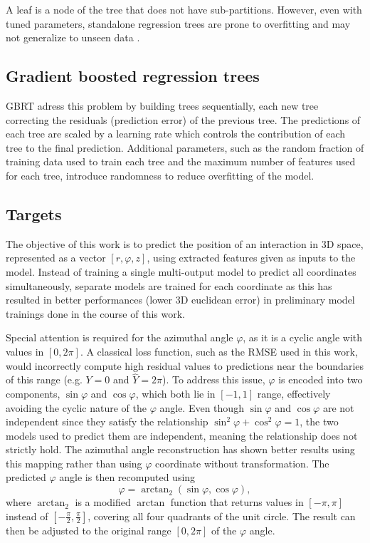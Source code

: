 A leaf is a node of the tree that does not have sub-partitions. However, even with tuned parameters, standalone regression trees are prone to overfitting and may not generalize to unseen data \cite{hastie01statisticallearning}.

\subsection{Gradient boosted regression trees}

GBRT adress this problem by building trees sequentially, each new tree correcting the residuals (prediction error) of the previous tree. The predictions of each tree are scaled by a learning rate which controls the contribution of each tree to the final prediction. Additional parameters, such as the random fraction of training data used to train each tree and the maximum number of features used for each tree, introduce randomness to reduce overfitting of the model.

\subsection{Targets}

The objective of this work is to predict the position of an interaction in 3D space, represented as a vector $[r, \varphi, z]$, using extracted features given as inputs to the model. Instead of training a single multi-output model to predict all coordinates simultaneously, separate models are trained for each coordinate as this has resulted in better performances (lower 3D euclidean error) in preliminary model trainings done in the course of this work.

Special attention is required for the azimuthal angle $\varphi$, as it is a cyclic angle with values in $[0, 2\pi]$. A classical loss function, such as the RMSE used in this work, would incorrectly compute high residual values to predictions near the boundaries of this range (e.g. $Y = 0$ and $\hat Y = 2\pi$).
To address this issue, $\varphi$ is encoded into two components, $\sin \varphi$ and $\cos \varphi$, which both lie in $[-1, 1]$ range, effectively avoiding the cyclic nature of the $\varphi$ angle. Even though $\sin \varphi$ and $\cos \varphi$ are not independent since they satisfy the relationship $\sin^2 \varphi + \cos^2 \varphi = 1$, the two models used to predict them are independent, meaning the relationship does not strictly hold. The azimuthal angle reconstruction has shown better results using this mapping rather than using $\varphi$ coordinate without transformation. The predicted $\varphi$ angle is then recomputed using 
\begin{equation}
\label{eq:atan2}
    \varphi = \operatorname{arctan}_2(\sin \varphi, \cos \varphi),
\end{equation}
where $\operatorname{arctan}_2$ is a modified $\arctan$ function that returns values in $[-\pi, \pi]$ instead of $[-\frac{\pi}{2}, \frac{\pi}{2}]$, covering all four quadrants of the unit circle. The result can then be adjusted to the original range $[0, 2\pi]$ of the $\varphi$ angle.

